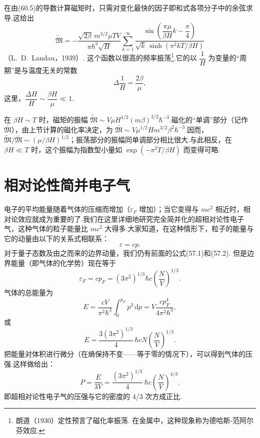 在由(60.5)的导数计算磁矩时，只需对变化最快的因子即和式各项分子中的余弦求导.这给出
\begin{equation}
  \tilde{\mathfrak{M}}=-\frac{\sqrt{2\beta}\,m^{3/2}\mu TV}{\pi\hbar^3\sqrt{H}}
  \sum_{k=1}^{\infty}
  \frac{\sin\left(\dfrac{\pi\mu}{\beta H}k-\dfrac{\pi}{4}\right)}
  {\sqrt{k}\,\sinh\left(\pi^2kT/\beta H\right)}
\end{equation}
（L.~D.~Landau，1939）. 这个函数以很高的频率振荡\footnote{朗道（1930）定性预言了磁化率振荡. 在金属中，这种现象称为德哈斯-范阿尔芬效应.}.它的以 $\dfrac{1}{H}$ 为变量的“周期”是与温度无关的常数
\begin{equation}
  \Delta\frac{1}{H}=\frac{2\beta}{\mu},
\end{equation}
这里，$\dfrac{\Delta H}{H}\sim\dfrac{\beta H}{\mu}\ll1$.

在 $\beta H\sim T$ 时，磁矩的振幅 $\tilde{\mathfrak{M}}\sim V\mu H^{1/2}(m\beta)^{3/2}\hbar^{-3}$.磁化的“单调”部分（记作 $\bar{\mathfrak{M}}$），由上节计算的磁化率决定，为 $\bar{\mathfrak{M}}\sim V\mu^{1/2}Hm^{3/2}\beta^2\hbar^{-3}$.因而，$\tilde{\mathfrak{M}}/\bar{\mathfrak{M}}\sim(\mu/\beta H)^{1/2}$；振荡部分的振幅同单调部分相比很大.与此相反，在 $\beta H\ll T$ 时，这个振幅为指数型小量如 $\exp(-\pi^2T/\beta H)$ 而变得可略.

\section{相对论性简并电子气}

电子的平均能量随着气体的压缩而增加（$\varepsilon_F$ 增加）；当它变得与 $mc^2$ 相近时，相对论效应就成为重要的了.我们在这里详细地研究完全简并化的超相对论性电子气，这种气体的粒子能量比 $mc^2$ 大得多.大家知道，在这种情形下，粒子的能量与它的动量由以下的关系式相联系：
\begin{equation}
  \varepsilon=cp.
\end{equation}
对于量子态数及由之而来的边界动量，我们仍有前面的公式(57.1)和(57.2). 但是边界能量（即气体的化学势）现在等于
\begin{equation}
  \varepsilon_F=cp_F=(3\pi^2)^{1/3}\hbar c\left(\frac{N}{V}\right)^{1/3}.
\end{equation}
气体的总能量为
\begin{equation*}
  E=\frac{cV}{\pi^2\hbar^3}\int_0^{p_F}p^3\,\mathrm{d}p
  =V\frac{cp_F^4}{4\pi^2\hbar^3},
\end{equation*}
或
\begin{equation}
  E=\frac{3\left(3\pi^2\right)^{1/3}}{4}\,\hbar cN\left(\frac{N}{V}\right)^{1/3}.
\end{equation}
把能量对体积进行微分（在熵保持不变——等于零的情况下），可以得到气体的压强.这样做给出：
\begin{equation}
  P=\frac{E}{3V}=\frac{\left(3\pi^2\right)^{1/3}}{4}\,\hbar c
  \left(\frac{N}{V}\right)^{4/3}.
\end{equation}
即超相对论性电子气的压强与它的密度的 4/3 次方成正比.

